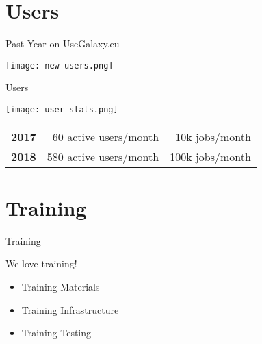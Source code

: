 \documentclass[12pt]{euslides}
\begin{document}

\section{Users}
\begin{frame}{Past Year on UseGalaxy.eu}
	\begin{center}
	\texttt{[image: new-users.png]}
	\end{center}
\end{frame}

\begin{frame}{Users}
	\begin{center}
	\texttt{[image: user-stats.png]}
	\end{center}

	\begin{tabular}{rrr}
		\textbf{2017} &  60 active users/month &  10k jobs/month\\
		\textbf{2018} & 580 active users/month & 100k jobs/month
	\end{tabular}
\end{frame}

\section{Training}
\begin{frame}{Training}
	\begin{center}
		We love training!

		\begin{itemize}
			\item Training Materials
			\item Training Infrastructure
			\item Training Testing
		\end{itemize}
	\end{center}
\end{frame}
\end{document}
